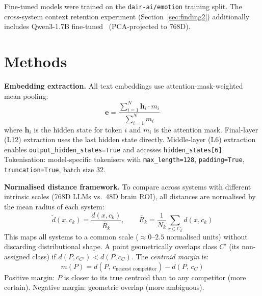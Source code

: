 \documentclass{article}
\begin{document}
Fine-tuned models were trained on the \texttt{dair-ai/emotion} training split.
The cross-system context retention experiment (Section~\ref{sec:finding2}) additionally
includes Qwen3-1.7B fine-tuned~\citep{qwen2025} (PCA-projected to 768D).

\section{Methods}

\textbf{Embedding extraction.}
All text embeddings use attention-mask-weighted mean pooling:
\begin{equation}
  \mathbf{e} = \frac{\sum_{i=1}^{N} \mathbf{h}_i \cdot m_i}{\sum_{i=1}^{N} m_i}
  \label{eq:pooling}
\end{equation}
where $\mathbf{h}_i$ is the hidden state for token $i$ and $m_i$ is the attention mask.
Final-layer (L12) extraction uses the last hidden state directly.
Middle-layer (L6) extraction enables \texttt{output\_hidden\_states=True} and accesses
\texttt{hidden\_states[6]}.
Tokenisation: model-specific tokenisers with \texttt{max\_length=128},
\texttt{padding=True}, \texttt{truncation=True}, batch size 32.

\textbf{Normalised distance framework.}
To compare across systems with different intrinsic scales (768D LLMs vs.\ 48D brain
ROI), all distances are normalised by the mean radius of each system:
\begin{equation}
  \tilde{d}(x, c_k) = \frac{d(x, c_k)}{\bar{R}_k},
  \qquad
  \bar{R}_k = \frac{1}{N_k}\sum_{x \in C_k} d(x, c_k)
  \label{eq:normdist}
\end{equation}
This maps all systems to a common scale ($\approx\!0$--$2.5$ normalised units) without
discarding distributional shape.
A point geometrically overlaps class $C'$ (its non-assigned class) if
$d(P, c_{C'}) < d(P, c_C)$.
The \emph{centroid margin} is:
\begin{equation}
  m(P) = d(P,\, c_{\text{nearest competitor}}) - d(P,\, c_C)
  \label{eq:margin}
\end{equation}
Positive margin: $P$ is closer to its true centroid than to any competitor (more
certain). Negative margin: geometric overlap (more ambiguous).
\end{document}
